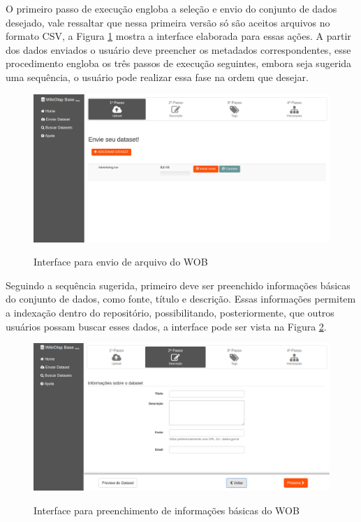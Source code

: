 O primeiro passo de execução engloba a seleção e envio do conjunto de dados desejado, vale
ressaltar que nessa primeira versão só são aceitos arquivos no formato CSV, a Figura \ref{fig:wob-sendfile} 
mostra a interface elaborada para essas ações. A partir dos dados enviados o usuário deve 
preencher os metadados correspondentes, esse procedimento engloba os três passos de execução 
seguintes, embora seja sugerida uma sequência, o usuário pode realizar essa fase na ordem 
que desejar. 

\begin{figure}[!htb]
    \centering
    \caption{Interface para envio de arquivo do WOB}
    \includegraphics[width=1.1\textwidth]{./04-figuras/wob-sendfile}
    \label{fig:wob-sendfile}
\end{figure}

Seguindo a sequência sugerida, primeiro deve ser preenchido informações básicas do conjunto 
de dados, como fonte, título e descrição. Essas informações permitem a indexação dentro do 
repositório, possibilitando, posteriormente, que outros usuários possam buscar esses dados, 
a interface pode ser vista na Figura \ref{fig:wob-info}.

\begin{figure}[!htb]
    \centering
    \caption{Interface para preenchimento de informações básicas do WOB}
    \includegraphics[width=1\textwidth]{./04-figuras/wob-info}
    \label{fig:wob-info}
\end{figure} \newpage


